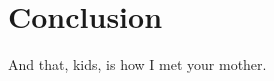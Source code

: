 \documentclass[thesis.tex]{subfiles}
\begin{document}
\section{Conclusion}
And that, kids, is how I met your mother.
\end{document}
